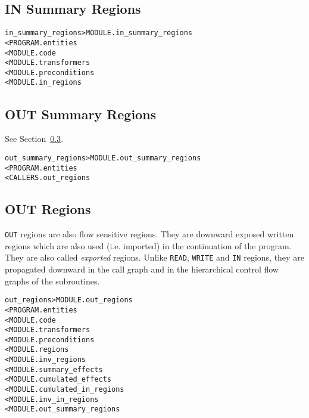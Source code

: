 \documentclass[a4paper]{report}
\newenvironment{PipsMake}{\begin{alltt}}{\end{alltt}}
\begin{document}
\subsection{IN Summary Regions}
\label{subsubsection-in-summary-regions}

\begin{PipsMake}
in_summary_regions              > MODULE.in_summary_regions
        < PROGRAM.entities
        < MODULE.code
        < MODULE.transformers
        < MODULE.preconditions 
        < MODULE.in_regions  
\end{PipsMake}


\subsection{OUT Summary Regions}
\label{subsubsection-out-summary-regions}

See Section~\ref{subsubsection-out-regions}.

\begin{PipsMake}
out_summary_regions             > MODULE.out_summary_regions
        < PROGRAM.entities
        < CALLERS.out_regions  
\end{PipsMake}


\subsection{OUT Regions}
\label{subsubsection-out-regions}

\verb+OUT+ regions are also flow sensitive regions. They are downward
exposed written regions which are also used (i.e. imported) in the
continuation of the program. They are also called {\em exported\/} regions.
Unlike \verb+READ+, \verb+WRITE+ and \verb+IN+ regions, they are propagated
downward in the call graph and in the hierarchical control flow graphs of
the subroutines.

\begin{PipsMake}
out_regions                     > MODULE.out_regions
        < PROGRAM.entities
        < MODULE.code 
        < MODULE.transformers
        < MODULE.preconditions
        < MODULE.regions
        < MODULE.inv_regions
        < MODULE.summary_effects
        < MODULE.cumulated_effects
        < MODULE.cumulated_in_regions
        < MODULE.inv_in_regions
        < MODULE.out_summary_regions
\end{PipsMake}
\end{document}
